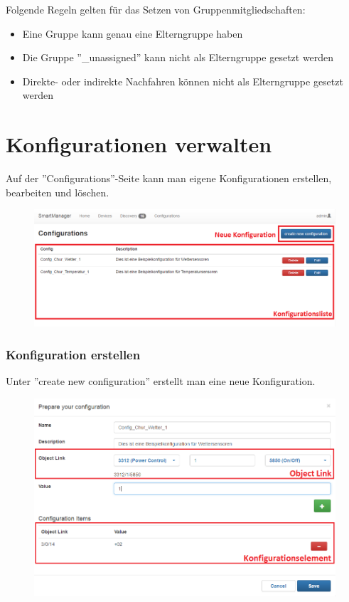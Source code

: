 Folgende Regeln gelten für das Setzen von Gruppenmitgliedschaften:
\begin{itemize}
\item Eine Gruppe kann genau eine Elterngruppe haben
\item Die Gruppe ''\_unassigned'' kann nicht als Elterngruppe gesetzt werden
\item Direkte- oder indirekte Nachfahren können nicht als Elterngruppe gesetzt werden
\end{itemize}
\newpage

\section{Konfigurationen verwalten}
Auf der ''Configurations''-Seite kann man eigene Konfigurationen erstellen, bearbeiten und löschen.

\begin{figure}[H]
\includegraphics[scale=0.57]{../05_Schlussbericht/images/benutzeranleitung/configurations_overview.png}
\end{figure} 

\subsubsection{Konfiguration erstellen}
Unter ''create new configuration'' erstellt man eine neue Konfiguration.

\begin{figure}[H]
\includegraphics[scale=0.57]{../05_Schlussbericht/images/benutzeranleitung/create_configuration.png}
\end{figure} 

